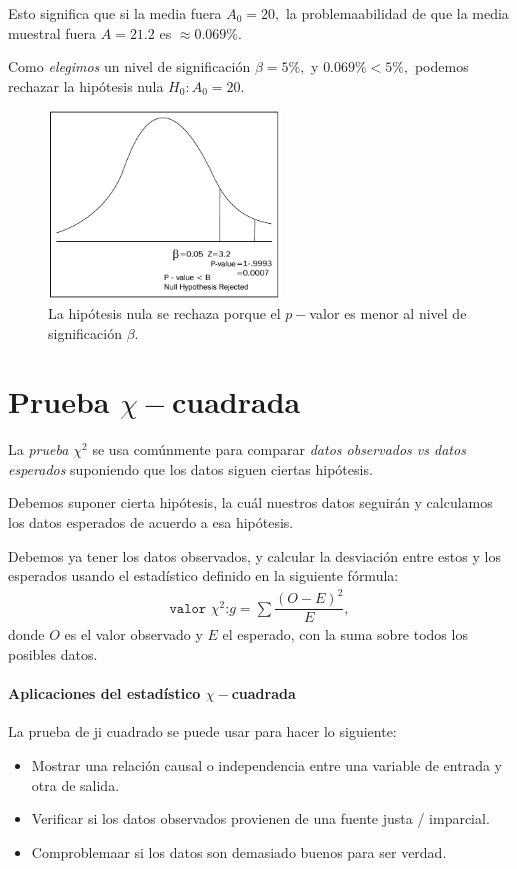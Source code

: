  Esto significa que si la media fuera $A_{0}=20,$ la problemaabilidad de que la media muestral fuera $A=21.2$ es $\approx 0.069\%.$
 

 Como \emph{elegimos} un nivel de significación $\beta=5\%,$ y $0.069\% < 5\%,$ podemos rechazar la hipótesis nula $H_{0}: A_{0}=20.$


\begin{figure}
 \centering
 \includegraphics[height=5cm,keepaspectratio=true]{./images/kum0405.png}
 \caption{La hipótesis nula se rechaza porque el $p-$valor es menor al nivel de significación $\beta$.}
 \label{fig:0405}
\end{figure}


\section{Prueba $\chi-$cuadrada}

La \emph{prueba $\chi^{2}$} se usa comúnmente para comparar \emph{datos observados vs datos esperados} suponiendo que los datos siguen ciertas hipótesis.


Debemos suponer cierta hipótesis, la cuál nuestros datos seguirán y calculamos los datos esperados de acuerdo a esa hipótesis.


Debemos ya tener los datos observados, y calcular la desviación entre estos y los esperados usando el estadístico definido en la siguiente fórmula:
\begin{align}
 \texttt{valor }\chi^{2}\texttt{:} g= \sum\dfrac{\left( O-E \right)^{2}}{E},
\end{align}
donde $O$ es el valor observado y $E$ el esperado, con la suma sobre todos los posibles datos.

\paragraph{Aplicaciones del estadístico $\chi-$cuadrada}
La prueba de ji cuadrado se puede usar para hacer lo siguiente:
\begin{itemize}
\item Mostrar una relación causal o independencia entre una variable de entrada y otra de salida.  
\item Verificar si los datos observados provienen de una fuente justa / imparcial. 
\item Comproblemaar si los datos son demasiado buenos para ser verdad.
\end{itemize}


